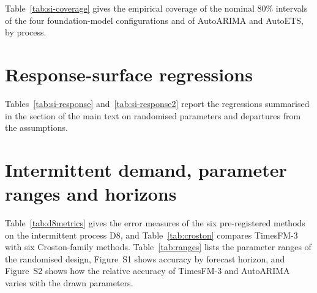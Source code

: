 \documentclass[ASNA]{USG}
\providecommand{\tableref}[1]{Table~\ref{#1}}
\begin{document}
\tableref{tab:si-coverage} gives the empirical coverage of the nominal 80\% intervals of the four
foundation-model configurations and of AutoARIMA and AutoETS, by process.



\section{Response-surface regressions}
\label{si:response}

Tables~\ref{tab:si-response} and~\ref{tab:si-response2} report the regressions summarised in the section of the main text on
randomised parameters and departures from the assumptions.



\section{Intermittent demand, parameter ranges and horizons}
\label{si:additional}

\tableref{tab:d8metrics} gives the error measures of the six pre-registered methods on the
intermittent process D8, and \tableref{tab:croston} compares TimesFM-3 with six Croston-family methods.
\tableref{tab:ranges} lists the parameter ranges of the randomised design, Figure~S1 shows accuracy by
forecast horizon, and Figure~S2 shows how the relative accuracy of TimesFM-3 and AutoARIMA varies with the
drawn parameters.




\end{document}
